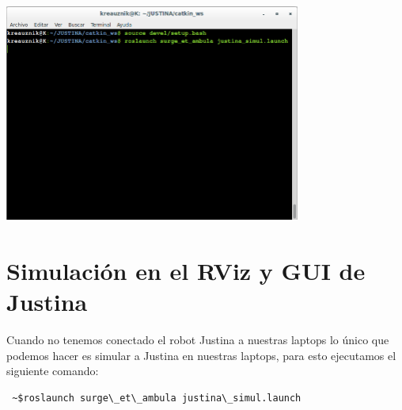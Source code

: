 \documentclass[user_manual.tex]{subfiles}
\begin{document}
 \begin{center}
\includegraphics[width=0.73\textwidth]{Figures/PP/pp6.png}
\end{center}
\section{Simulación en el RViz y GUI de Justina}
Cuando no tenemos conectado el robot Justina a nuestras laptops lo único que podemos hacer
es simular a Justina en nuestras laptops, para esto ejecutamos el siguiente comando:
\begin{verbatim}
 ~$roslaunch surge\_et\_ambula justina\_simul.launch
\end{verbatim}
\end{document}
